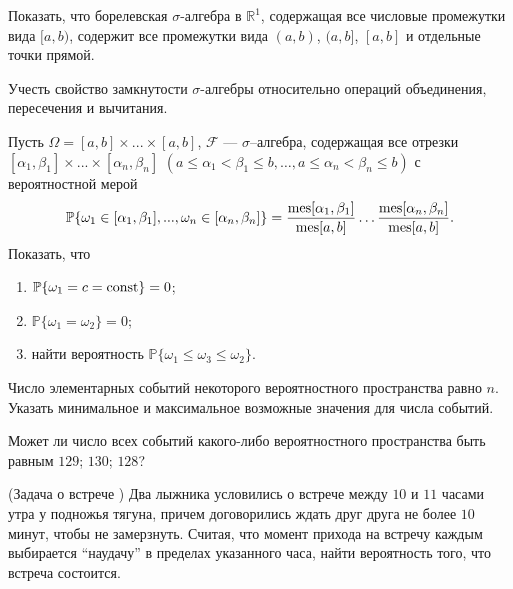 
\begin{problem}
Показать, что борелевская $\sigma$-алгебра в ${\mathbb R}^1$, содержащая все числовые промежутки вида $[a,b)$, 
содержит все промежутки вида $(a,b)$, $(a,b]$, $[a,b]$ и отдельные точки прямой. 

\begin{ordre}
Учесть свойство замкнутости $\sigma$-алгебры относительно операций 
объединения, пересечения и вычитания. 
\end{ordre}

\end{problem}


\begin{problem}
Пусть $\Omega = [a,b]\times...\times[a,b]$, $\mathcal{F}$ --- $\sigma$–алгебра, содержащая все отрезки 
$[\alpha_1,\beta_1]\times...\times[\alpha_n,\beta_n]$ $(a \leqslant \alpha_1 < \beta_1 \leqslant b, \ldots, a \leqslant \alpha_n < \beta_n \leqslant b)$ с вероятностной мерой 
\[
{\mathbb P}\{ \omega_1  \in [\alpha_1,\beta_1], ..., \omega_n  \in [\alpha_n,\beta_n]  \}=\dfrac{\mathrm{mes}[\alpha_1, \beta_1]}{\mathrm{mes}[a,b]}  \ldots  \dfrac{\mathrm{mes}[\alpha_n, \beta_n]}{\mathrm{mes}[a,b]}.
\]
Показать, что 
\begin{enumerate}
\item ${\mathbb P}\{ \omega_1=c=\mathop{\mathrm{const}}\nolimits\}=0$; 
\item ${\mathbb P}\{ \omega_1=\omega_2\}=0$;
\item найти вероятность ${\mathbb P}\{ \omega_1 \leq \omega_3 \leq \omega_2\}$. 
\end{enumerate}

\end{problem}


\begin{problem}
Число элементарных событий некоторого вероятностного пространства равно $n$. Указать минимальное и максимальное возможные значения 
для числа событий. 
\end{problem}

\begin{problem}
Может ли число всех событий какого-либо вероятностного пространства быть равным $129$; $130$; $128$? 
\end{problem}


\begin{problem}(Задача о встрече \cite{2})
\label{L_extension}
Два лыжника условились о встрече между $10$ и $11$ часами утра у подножья тягуна, причем договорились ждать друг друга не более $10$ минут, чтобы не замерзнуть. Считая, что момент прихода на встречу каждым выбирается ``наудачу'' в пределах указанного часа, найти вероятность того, что встреча состоится. 
\end{problem}

